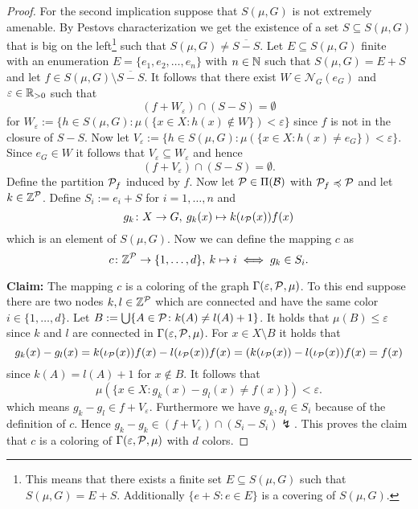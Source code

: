 \begin{proof}
  For the second implication suppose that $S(\mu, G)$ is not extremely amenable. By Pestovs characterization \cite[Theorem 3.4.9]{PestovDyn} we get the existence of a set $S \subseteq S(\mu, G)$ that is big on the left\footnote{This means that there exists a finite set $E \subseteq S(\mu, G)$ such that $S(\mu, G) = E + S.$ Additionally $\{e + S\colon e \in E\}$ is a covering of $S(\mu, G)$.} such that $S(\mu, G) \neq \overline{S - S}$. Let $E \subseteq S(\mu, G)$ finite with an enumeration $E = \{e_1, e_2, \ldots, e_n\}$ with $n \in \N$ such that $S(\mu, G) = E + S$ and let $f \in S(\mu, G) \setminus \overline{S - S}$. It follows that there exist $W \in \mathcal{N}_G(e_G)$ and $\varepsilon \in \R_{>0}$ such that
  \begin{equation*}
    (f + W_\varepsilon) \cap (S - S) = \emptyset
  \end{equation*}
  for $W_\varepsilon := \{h \in S(\mu, G)\colon \mu(\{x\in X\colon h(x) \notin W\}) < \varepsilon\}$ since $f$ is not in the closure of $S - S$. 
  Now let $V_\varepsilon := \{h \in S(\mu, G)\colon \mu(\{x\in X\colon h(x) \neq e_G\}) < \varepsilon\}$. Since $e_G \in W$ it follows that $V_\varepsilon \subseteq W_\varepsilon$ and hence
  \begin{equation*}
    (f + V_\varepsilon) \cap (S - S) = \emptyset.
  \end{equation*}
  Define the partition $\P_f$ induced by $f$.
  Now let $\P \in \Pi(\mathcal{B})$ with $\P_f \preccurlyeq \P$ and let $k \in \Z^\P$.
  Define $S_i := e_i + S$ for $i=1,\ldots,n$ and
  \begin{equation*}
    g_k\colon X \to G, \: g_k(x) \mapsto k(\iota_\P(x))f(x)
  \end{equation*}
  which is an element of $S(\mu, G)$. Now we can define the mapping $c$ as
  \begin{equation*}
    c\colon \Z^\P \to \{1,\ldots, d\}, \: k \mapsto i \iff g_k \in S_i.
  \end{equation*}

  \textbf{Claim:} The mapping $c$ is a coloring of the graph $\Gamma(\varepsilon, \P, \mu)$. To this end suppose there are two nodes $k, l \in \Z^\P$ which are connected and have the same color $i \in \{1, \ldots, d\}$. Let $B := \bigcup\{A\in\P\colon k(A) \neq l(A) + 1\}$. It holds that $\mu(B) \leq \varepsilon$ since $k$ and $l$ are connected in $\Gamma(\varepsilon, \P, \mu)$. For $x \in X\setminus B$ it holds that
  \begin{equation*}
    g_k(x) - g_l(x) = k(\iota_\P(x))f(x) - l(\iota_\P(x))f(x) = (k(\iota_\P(x)) - l(\iota_\P(x)) f(x) = f(x)
  \end{equation*}
  since $k(A) = l(A) + 1$ for $x \notin B$. It follows that
  \begin{equation*}
    \mu(\{x\in X\colon g_k(x) - g_l(x) \neq f(x)\}) < \varepsilon.
  \end{equation*}
  which means $g_k - g_l \in f + V_\varepsilon$. Furthermore we have $g_k, g_l \in S_i$ because of the definition of $c$. Hence $g_k - g_k \in (f + V_\varepsilon) \cap (S_i - S_i) \lightning$.
  This proves the claim that $c$ is a coloring of $\Gamma(\varepsilon,\P,\mu)$ with $d$ colors.
\end{proof}
